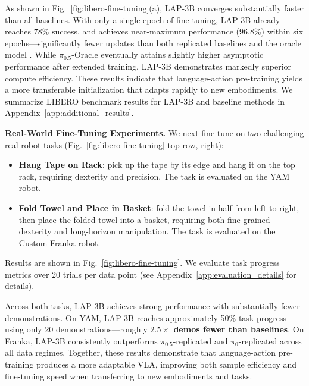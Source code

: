 As shown in Fig.~\ref{fig:libero-fine-tuning}(a), \textsc{LAP-3B} converges substantially faster than all baselines. With only a single epoch of fine-tuning, \textsc{LAP-3B} already reaches 78\% success, and achieves near-maximum performance (96.8\%) within six epochs---significantly fewer updates than both replicated baselines and the oracle model \cite{intelligence2025pi05visionlanguageactionmodelopenworld}. While $\pi_{0.5}$-Oracle eventually attains slightly higher asymptotic performance after extended training, \textsc{LAP-3B} demonstrates markedly superior compute efficiency. These results indicate that language-action pre-training yields a more transferable initialization that adapts rapidly to new embodiments. We summarize LIBERO benchmark results for \textsc{LAP-3B} and baseline methods in Appendix~\ref{app:additional_results}.

\noindent\textbf{Real-World Fine-Tuning Experiments.}
We next fine-tune on two challenging real-robot tasks (Fig.~\ref{fig:libero-fine-tuning} top row, right):
\begin{itemize}
    \item \textbf{Hang Tape on Rack}: pick up the tape by its edge and hang it on the top rack, requiring dexterity and precision. The task is evaluated on the YAM robot.
    \item \textbf{Fold Towel and Place in Basket}: fold the towel in half from left to right, then place the folded towel into a basket, requiring both fine-grained dexterity and long-horizon manipulation. The task is evaluated on the Custom Franka robot.
\end{itemize}
Results are shown in Fig.~\ref{fig:libero-fine-tuning}. We evaluate task progress metrics over 20 trials per data point (see Appendix~\ref{app:evaluation_details} for details).

Across both tasks, \textsc{LAP-3B} achieves strong performance with substantially fewer demonstrations. On YAM, \textsc{LAP-3B} reaches approximately 50\% task progress using only 20 demonstrations---roughly \textbf{$\bm{2.5\times}$ demos fewer than baselines}. On Franka, \textsc{LAP-3B} consistently outperforms $\pi_{0.5}$-replicated and $\pi_0$-replicated across all data regimes. Together, these results demonstrate that language-action pre-training produces a more adaptable VLA, improving both sample efficiency and fine-tuning speed when transferring to new embodiments and tasks.


